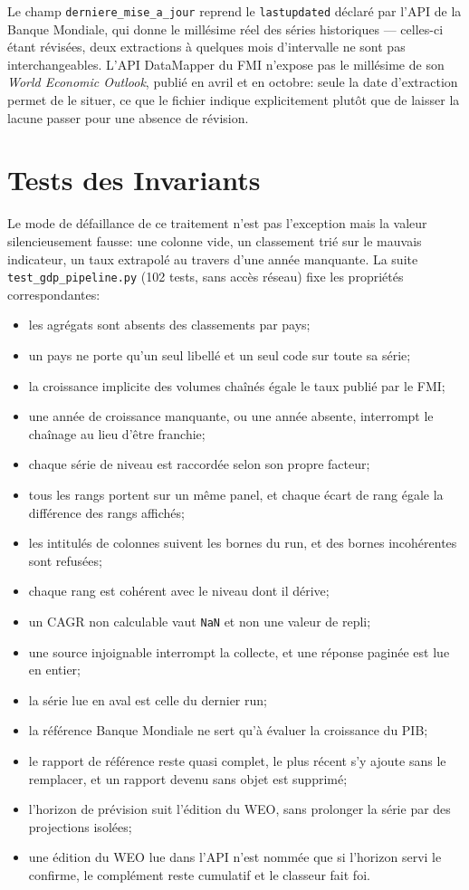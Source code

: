 \documentclass[11pt,a4paper]{article}
\begin{document}
Le champ \texttt{derniere\_mise\_a\_jour} reprend le \texttt{lastupdated} déclaré par l'API de la Banque Mondiale, qui donne le millésime réel des séries historiques --- celles-ci étant révisées, deux extractions à quelques mois d'intervalle ne sont pas interchangeables. L'API DataMapper du FMI n'expose pas le millésime de son \textit{World Economic Outlook}, publié en avril et en octobre: seule la date d'extraction permet de le situer, ce que le fichier indique explicitement plutôt que de laisser la lacune passer pour une absence de révision.

\section{Tests des Invariants}

Le mode de défaillance de ce traitement n'est pas l'exception mais la valeur silencieusement fausse: une colonne vide, un classement trié sur le mauvais indicateur, un taux extrapolé au travers d'une année manquante. La suite \texttt{test\_gdp\_pipeline.py} (102 tests, sans accès réseau) fixe les propriétés correspondantes:

\begin{itemize}
    \item les agrégats sont absents des classements par pays;
    \item un pays ne porte qu'un seul libellé et un seul code sur toute sa série;
    \item la croissance implicite des volumes chaînés égale le taux publié par le FMI;
    \item une année de croissance manquante, ou une année absente, interrompt le chaînage au lieu d'être franchie;
    \item chaque série de niveau est raccordée selon son propre facteur;
    \item tous les rangs portent sur un même panel, et chaque écart de rang égale la différence des rangs affichés;
    \item les intitulés de colonnes suivent les bornes du run, et des bornes incohérentes sont refusées;
    \item chaque rang est cohérent avec le niveau dont il dérive;
    \item un CAGR non calculable vaut \texttt{NaN} et non une valeur de repli;
    \item une source injoignable interrompt la collecte, et une réponse paginée est lue en entier;
    \item la série lue en aval est celle du dernier run;
    \item la référence Banque Mondiale ne sert qu'à évaluer la croissance du PIB;
    \item le rapport de référence reste quasi complet, le plus récent s'y ajoute sans le remplacer, et un rapport devenu sans objet est supprimé;
    \item l'horizon de prévision suit l'édition du WEO, sans prolonger la série par des projections isolées;
    \item une édition du WEO lue dans l'API n'est nommée que si l'horizon servi le confirme, le complément reste cumulatif et le classeur fait foi.
\end{itemize}
\end{document}
